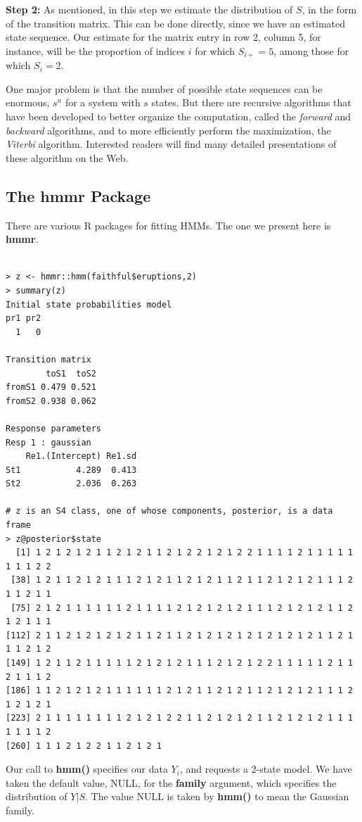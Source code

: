 \documentclass[11pt]{article}
\begin{document}
\textbf{Step 2:} As mentioned, in this step we estimate the distribution
of $S$, in the form of the transition matrix.  This can be done
directly, since we have an estimated state sequence.  Our estimate for
the matrix entry in row 2, column 5, for instance, will be the
proportion of indices $i$ for which $S_{i+} = 5$, among those for which
$S_i = 2$.

One major problem is that the number of possible state sequences can be
enormous, $s^n$ for a system with $s$ states.  But there are recursive
algorithms that have been developed to better organize the computation,
called the \textit{forward} and \textit{backward} algorithms, and to
more efficiently perform the maximization, the \textit{Viterbi}
algorithm.  Interested readers will find many detailed presentations of
these algorithm on the Web.

\subsection{The hmmr Package}

There are various R packages for fitting HMMs.  The one we present here
is \textbf{hmmr}.

\begin{lstlisting}

> z <- hmmr::hmm(faithful$eruptions,2)
> summary(z)
Initial state probabilities model 
pr1 pr2 
  1   0 

Transition matrix 
        toS1  toS2
fromS1 0.479 0.521
fromS2 0.938 0.062

Response parameters 
Resp 1 : gaussian 
    Re1.(Intercept) Re1.sd
St1           4.289  0.413
St2           2.036  0.263

# z is an S4 class, one of whose components, posterior, is a data frame
> z@posterior$state
  [1] 1 2 1 2 1 2 1 1 2 1 2 1 1 2 1 2 2 1 2 1 2 2 1 1 1 1 2 1 1 1 1 1 1 1 1 2 2
 [38] 1 2 1 1 2 1 2 1 1 1 2 1 2 1 1 2 1 2 1 1 2 1 1 2 1 2 1 2 1 1 1 2 1 1 2 1 1
 [75] 2 1 2 1 1 1 1 1 1 2 1 1 1 1 2 1 2 1 2 1 2 1 1 1 2 1 2 1 2 1 1 2 1 2 1 1 1
[112] 2 1 1 2 1 2 1 2 1 2 1 1 2 1 1 2 1 2 1 2 1 2 1 2 1 2 1 2 1 1 2 1 1 1 2 1 2
[149] 1 2 1 1 2 1 1 1 1 1 2 1 2 1 2 1 1 1 2 1 2 1 2 2 1 1 1 1 1 2 1 1 2 1 1 1 2
[186] 1 1 2 1 2 1 2 1 1 1 1 1 1 2 1 2 1 1 2 1 2 1 1 2 1 2 1 2 1 1 1 2 1 2 1 2 1
[223] 2 1 1 1 1 1 1 1 1 2 1 2 1 2 2 1 1 2 1 2 1 2 1 1 2 1 2 1 2 1 1 1 1 1 1 1 2
[260] 1 1 1 2 1 2 2 1 1 2 1 2 1

\end{lstlisting}

Our call to \textbf{hmm()} specifies our data $Y_i$, and requests a 2-state
model.  We have taken the default value, NULL, for the \textbf{family}
argument, which specifies the distribution of $Y | S$.  The value NULL
is taken by \textbf{hmm()} to mean the Gaussian family.
\end{document}
